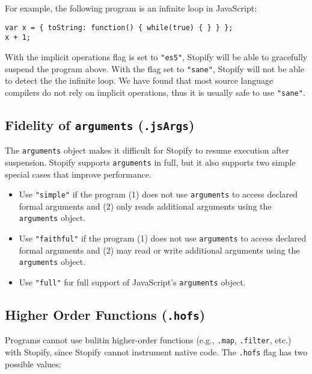 \documentclass[10pt]{book}
\begin{document}
For example, the following program is an infinite loop in JavaScript:

\begin{lstlisting}
var x = { toString: function() { while(true) { } } };
x + 1;
\end{lstlisting}

With the implicit operations flag is set to \lstinline|"es5"|, Stopify will be
able to gracefully suspend the program above. With the flag set to \lstinline|"sane"|,
Stopify will not be able to detect the the infinite loop. We have found that
most source language compilers do not rely on implicit operations, thus it is
usually safe to use \lstinline|"sane"|.

\subsection{Fidelity of \texttt{arguments} (\texttt{.jsArgs})\label{arguments-flag}}

The \lstinline|arguments| object makes it difficult for Stopify to resume
execution after suspension. Stopify supports \lstinline|arguments| in full, but
it also supports two simple special cases that improve performance.

\begin{itemize}

  \item Use \lstinline|"simple"| if the program (1) does not use \lstinline|arguments| to
    access declared formal arguments and (2) only reads additional
    arguments using the \lstinline|arguments| object.

  \item Use \lstinline|"faithful"| if the program (1) does not use \lstinline|arguments|
    to access declared formal arguments and (2) may read or write additional
    arguments using the \lstinline|arguments| object.

  \item Use \lstinline|"full"| for full support of JavaScript's \lstinline|arguments| object.

\end{itemize}

\subsection{Higher Order Functions (\texttt{.hofs}) \label{hofs-flag}}

Programs cannot use bulitin higher-order functions (e.g., \lstinline|.map|,
\lstinline|.filter|, etc.) with Stopify, since Stopify cannot instrument native
code. The \lstinline|.hofs| flag has two possible values:
\end{document}
